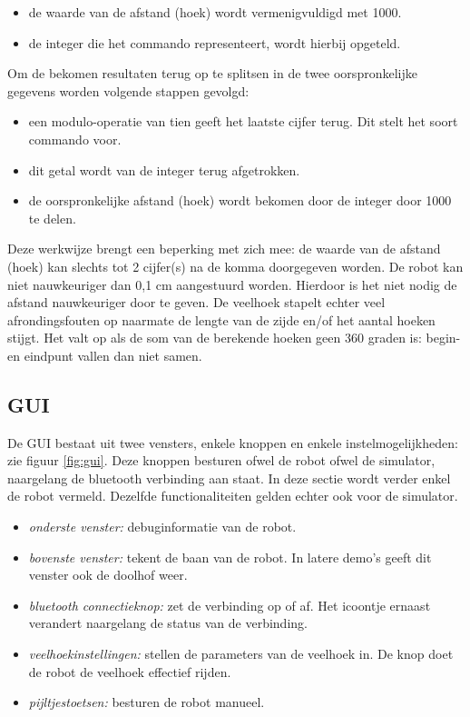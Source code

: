 \documentclass[tt1]{penoverslag}
\begin{document}
\begin{itemize}
\item de waarde van de afstand (hoek) wordt vermenigvuldigd met 1000.
\item de integer die het commando representeert, wordt hierbij opgeteld.
\end{itemize}

Om de bekomen resultaten terug op te splitsen in de twee oorspronkelijke gegevens worden volgende stappen gevolgd:

\begin{itemize}
\item een modulo-operatie van tien geeft het laatste cijfer terug. Dit stelt het soort commando voor.
\item dit getal wordt van de integer terug afgetrokken.
\item de oorspronkelijke afstand (hoek) wordt bekomen door de integer door 1000 te delen.
\end{itemize}

Deze werkwijze brengt een beperking met zich mee: de waarde van de afstand (hoek) kan slechts tot 2 cijfer(s) na de komma doorgegeven worden. De robot kan niet nauwkeuriger dan 0,1 cm aangestuurd worden. Hierdoor is het niet nodig de afstand nauwkeuriger door te geven. De veelhoek stapelt echter veel afrondingsfouten op naarmate de lengte van de zijde en/of het aantal hoeken stijgt. Het valt op als de som van de berekende hoeken geen 360 graden is: begin- en eindpunt vallen dan niet samen. 

\subsection{GUI}
\label{ssec:GUI}
De GUI bestaat uit twee vensters, enkele knoppen en enkele instelmogelijkheden: zie figuur \ref{fig:gui}. Deze knoppen besturen ofwel de robot ofwel de simulator, naargelang de bluetooth verbinding aan staat. In deze sectie wordt verder enkel de robot vermeld. Dezelfde functionaliteiten gelden echter ook voor de simulator.

\begin{itemize}
\item \textit{onderste venster:} debuginformatie van de robot.
\item \textit{bovenste venster:} tekent de baan van de robot. In latere demo's geeft dit venster ook de doolhof weer.
\item \textit{bluetooth connectieknop:} zet de verbinding op of af. Het icoontje ernaast verandert naargelang de status van de verbinding.
\item \textit{veelhoekinstellingen:} stellen de parameters van de veelhoek in. De knop doet de robot de veelhoek effectief rijden.
\item \textit{pijltjestoetsen:} besturen de robot manueel.
\end{itemize}
\end{document}
